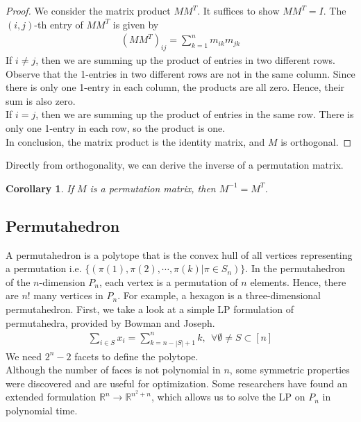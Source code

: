 \documentclass[12pt,letterpaper]{article}
\newcommand*{\R}{\mathbb{R}}
\newtheorem{corollary}[theorem]{Corollary}
\begin{document}
\begin{proof}
    We consider the matrix product $MM^T$. It suffices to show $MM^T = I$. The $(i, j)$-th entry of $MM^T$ is given by 
    \begin{align*}
        (MM^T)_{ij} = \sum_{k = 1}^n m_{ik}m_{jk}
    \end{align*}
    If $i \neq j$, then we are summing up the product of entries in two different rows. 
    Observe that the 1-entries in two different rows are not in the same column.
    Since there is only one 1-entry in each column, the products are all zero. Hence, their sum is also zero. \\ 
    If $i = j$, then we are summing up the product of entries in the same row.
    There is only one 1-entry in each row, so the product is one. \\
    In conclusion, the matrix product is the identity matrix, and $M$ is orthogonal.
\end{proof}
Directly from orthogonality, we can derive the inverse of a permutation matrix.
\begin{corollary}
    \label{cor:inverse}
    If $M$ is a permutation matrix, then $M^{-1} = M^T$.
\end{corollary}


\subsection{Permutahedron}
A permutahedron is a polytope that is the convex hull of all vertices representing a permutation i.e. $\{(\pi(1), \pi(2), \cdots, \pi(k) | \pi \in S_n) \}$. \cite{doi:10.1137/0122054}
In the permutahedron of the $n$-dimension $P_n$, each vertex is a permutation of $n$ elements.
Hence, there are $n!$ many vertices in $P_n$. For example, a hexagon is a three-dimensional permutahedron. 
First, we take a look at a simple LP formulation of permutahedra, provided by Bowman and Joseph. \cite{bowman1972permutation}
\begin{align*}
    \sum_{i \in S} x_i = \sum_{k = n - |S| + 1}^n k, \ \ \forall \emptyset \neq S \subset [n]
\end{align*}
We need $2^n - 2$ facets to define the polytope.\\
Although the number of faces is not polynomial in $n$,
some symmetric properties were discovered and are useful for optimization. Some researchers \cite{bowman1972permutation}
have found an extended formulation $\R^{n} \rightarrow \R^{n^2 + n}$, which allows us 
to solve the LP on $P_n$ in polynomial time. 
\end{document}
